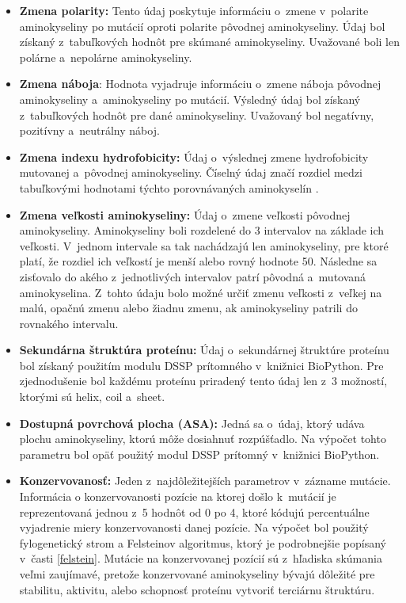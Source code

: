 \begin{itemize}
	\item \textbf{Zmena polarity:} Tento údaj poskytuje informáciu o~zmene v~polarite aminokyseliny po mutácií oproti polarite pôvodnej aminokyseliny. Údaj bol získaný z~tabuľkových hodnôt pre skúmané aminokyseliny. Uvažované boli len polárne a~nepolárne aminokyseliny.
	\item \textbf{Zmena náboja}: Hodnota vyjadruje informáciu o~zmene náboja pôvodnej aminokyseliny a~aminokyseliny po mutácií. Výsledný údaj bol získaný z~tabuľkových hodnôt pre dané aminokyseliny. Uvažovaný bol negatívny, pozitívny a~neutrálny náboj. 
	\item \textbf{Zmena indexu hydrofobicity:} Údaj o~výslednej zmene hydrofobicity mutovanej a~pôvodnej aminokyseliny. Číselný údaj značí rozdiel medzi tabuľkovými hodnotami týchto porovnávaných aminokyselín \cite{hydrophobicity}. 
	\item \textbf{Zmena veľkosti aminokyseliny:} Údaj o~zmene veľkosti pôvodnej aminokyseliny. Aminokyseliny boli rozdelené do 3 intervalov na základe ich veľkosti. V~jednom intervale sa tak nachádzajú len aminokyseliny, pre ktoré platí, že rozdiel ich veľkostí je menší alebo rovný hodnote 50. Následne sa zisťovalo do akého z~jednotlivých intervalov patrí pôvodná a~mutovaná aminokyselina. Z~tohto údaju bolo možné určiť zmenu veľkosti z~veľkej na malú, opačnú zmenu alebo žiadnu zmenu, ak aminokyseliny patrili do rovnakého intervalu.
	\item \textbf{Sekundárna štruktúra proteínu:} Údaj o~sekundárnej štruktúre proteínu bol získaný použitím modulu DSSP prítomného v~knižnici BioPython. Pre zjednodušenie bol každému proteínu priradený tento údaj len z~3 možností, ktorými sú helix, coil a sheet.
	\item \textbf{Dostupná povrchová plocha (ASA):} Jedná sa o~údaj, ktorý udáva plochu aminokyseliny, ktorú môže dosiahnuť rozpúšťadlo. Na výpočet tohto parametru bol opäť použitý modul DSSP prítomný v~knižnici BioPython.
	\item \textbf{Konzervovanosť:} Jeden z~najdôležitejších parametrov v~zázname mutácie. Informácia o konzervovanosti pozície na ktorej došlo k~mutácií je reprezentovaná
	jednou z~5 hodnôt od 0 po 4, ktoré kódujú percentuálne vyjadrenie miery konzervovanosti danej pozície. Na výpočet bol použitý fylogenetický strom a Felsteinov algoritmus, ktorý je podrobnejšie popísaný v~časti \ref{felstein}. Mutácie na konzervovanej pozícií sú z~hľadiska skúmania veľmi zaujímavé, pretože konzervované aminokyseliny bývajú dôležité pre stabilitu, aktivitu, alebo schopnosť proteínu vytvoriť terciárnu štruktúru.

\end{itemize}

